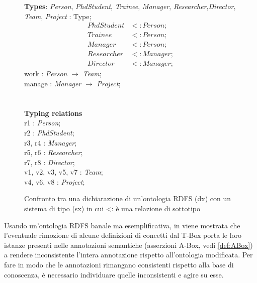 \begin{figure}[t!]
\begin{minipage}[t]{0.45\textwidth}
			\textbf{Types}: \textit{Person}, \textit{PhdStudent}, \textit{Trainee}, \textit{Manager}, \textit{Researcher},\textit{Director}, \textit{Team}, \textit{Project} : Type;
			\begin{align}
			PhdStudent &<: Person;\\
			Trainee &<: Person;\\
			Manager &<: Person;\\
			Researcher &<: Manager;\\
			Director &<: Manager;
		\end{align}
			work : \textit{Person} $\to$ \textit{Team};\\
			manage : \textit{Manager} $\to$ \textit{Project};\\\\\\
			\textbf{Typing relations}\\
			r1 : \textit{Person};\\
			r2 : \textit{PhdStudent};\\
			r3, r4 : \textit{Manager};\\
			r5, r6 : \textit{Researcher};\\
			r7, r8 : \textit{Director};\\
			v1, v2, v3, v5, v7 : \textit{Team};\\
			v4, v6, v8 : \textit{Project};\\
	\end{minipage}
	\captionsetup{justification=Centering}
	\caption{Confronto tra una dichiarazione di un'ontologia RDFS (dx) con un sistema di tipo (sx) in cui <: è una relazione di sottotipo}
	\label{fig:confrontotypesystem}
\end{figure}

\noindent
Usando un'ontologia RDFS banale ma esemplificativa, in \cite{despeyroux2008evolution} viene mostrata che l'eventuale rimozione di  alcune definizioni di concetti dal T-Box porta le loro istanze presenti nelle annotazioni semantiche (asserzioni A-Box, vedi \autoref{def:ABox}) a rendere inconsistente l'intera annotazione rispetto all'ontologia modificata. Per fare in modo che le annotazioni rimangano consistenti rispetto alla base di conoscenza, è necessario individuare quelle inconsistenti e agire su esse.

